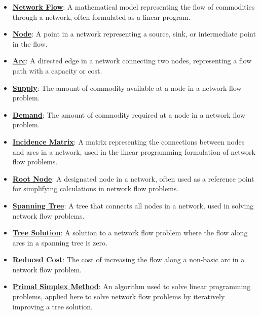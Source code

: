 \documentclass{article}%
\begin{document}
\begin{itemize}[leftmargin=*]%
\item \href{https://www.math.purdue.edu/~yipn/421/2024-11-05-NetFlows.pdf#page=1}{\textbf{Network Flow}}: A mathematical model representing the flow of commodities through a network, often formulated as a linear program.%
\item \href{https://www.math.purdue.edu/~yipn/421/2024-11-05-NetFlows.pdf#page=1}{\textbf{Node}}: A point in a network representing a source, sink, or intermediate point in the flow.%
\item \href{https://www.math.purdue.edu/~yipn/421/2024-11-05-NetFlows.pdf#page=1}{\textbf{Arc}}: A directed edge in a network connecting two nodes, representing a flow path with a capacity or cost.%
\item \href{https://www.math.purdue.edu/~yipn/421/2024-11-05-NetFlows.pdf#page=2}{\textbf{Supply}}: The amount of commodity available at a node in a network flow problem.%
\item \href{https://www.math.purdue.edu/~yipn/421/2024-11-05-NetFlows.pdf#page=2}{\textbf{Demand}}: The amount of commodity required at a node in a network flow problem.%
\item \href{https://www.math.purdue.edu/~yipn/421/2024-11-05-NetFlows.pdf#page=4}{\textbf{Incidence Matrix}}: A matrix representing the connections between nodes and arcs in a network, used in the linear programming formulation of network flow problems.%
\item \href{https://www.math.purdue.edu/~yipn/421/2024-11-05-NetFlows.pdf#page=6}{\textbf{Root Node}}: A designated node in a network, often used as a reference point for simplifying calculations in network flow problems.%
\item \href{https://www.math.purdue.edu/~yipn/421/2024-11-05-NetFlows.pdf#page=10}{\textbf{Spanning Tree}}: A tree that connects all nodes in a network, used in solving network flow problems.%
\item \href{https://www.math.purdue.edu/~yipn/421/2024-11-05-NetFlows.pdf#page=11}{\textbf{Tree Solution}}: A solution to a network flow problem where the flow along arcs in a spanning tree is zero.%
\item \href{https://www.math.purdue.edu/~yipn/421/2024-11-05-NetFlows.pdf#page=22}{\textbf{Reduced Cost}}: The cost of increasing the flow along a non-basic arc in a network flow problem.%
\item \href{https://www.math.purdue.edu/~yipn/421/2024-11-05-NetFlows.pdf#page=22}{\textbf{Primal Simplex Method}}: An algorithm used to solve linear programming problems, applied here to solve network flow problems by iteratively improving a tree solution.%
\end{itemize}%
\end{document}
